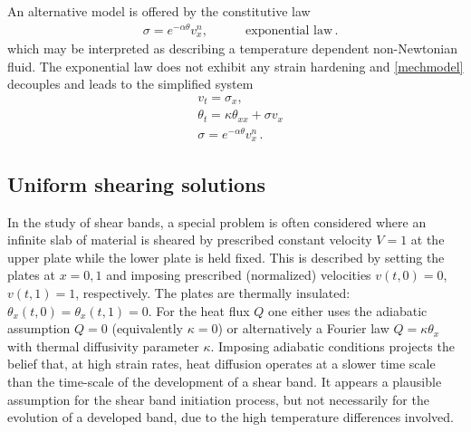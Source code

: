\documentclass[a4paper,11pt]{article}
\newcommand{\tht}{\theta}
\newcommand{\ga}{\alpha}
\theoremstyle{remark}
\begin{document}
An alternative model is offered by the constitutive law
\begin{align}
& \sigma = e^{-\ga\tht} v_x^n, \quad & & \text{ exponential law} \label{ARL0}  \, .
\end{align}
which may be interpreted as describing a temperature dependent non-Newtonian fluid. 
The exponential law does not exhibit any strain hardening and \eqref{mechmodel} decouples and
leads to the simplified system
\begin{equation}
  \label{ARS}
  \begin{aligned}
    & v_{t} = \sigma_{x},\\
    & \theta_{t} = \kappa \theta_{ x x}  +  \sigma v_x \\
    & \sigma  = e^{-\ga\theta} v_x^n \, .
  \end{aligned}
\end{equation}



\subsection{Uniform shearing solutions} \label{sec:uss}

In the study of shear bands,  a special problem is often considered  where an infinite slab of material
is  sheared by prescribed constant velocity $V=1$ at the upper plate while the lower plate is held fixed.
This is described by setting the plates at $x=0, 1$ and imposing prescribed (normalized) velocities $v(t,0) = 0$,  $v(t,1) = 1$, respectively.
The plates are thermally insulated:  $ \theta_{x}(t,0) = \theta_{x}(t,1) = 0$.
For the heat flux $Q$ one either uses the adiabatic assumption $Q = 0$ (equivalently $\kappa = 0$)
or alternatively a Fourier  law $Q = \kappa \theta_{x}$ with thermal diffusivity
parameter $\kappa$.
Imposing adiabatic conditions projects the belief that, at high strain rates,
heat diffusion operates at a slower time scale than the time-scale of the development 
of a shear band. It appears a plausible assumption for the shear band initiation process, 
but not necessarily for the evolution of a developed band,
 due to the high temperature differences involved.
 
\end{document}
